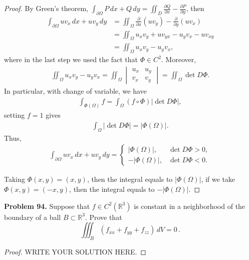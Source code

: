 \documentclass[11pt]{article}
\theoremstyle{definition}
\theoremstyle{definition}
\begin{document}
\begin{proof}
By Green's theorem, $\int_{\partial \Omega} P\, dx + Q\, dy = \iint_D \frac{\partial Q}{\partial x} - \frac{\partial P}{\partial y}$, then
\begin{align*}
    \int_{\partial\Omega} uv_x\, dx + uv_y\, dy & = \iint_\Omega \frac{\partial}{\partial x} \left(uv_y \right) - \frac{\partial}{\partial y} \left(uv_x \right) \\
    & = \iint_\Omega u_xv_y + u v_{yx} - u_y v_x - u v_{xy} \\
    & = \iint_\Omega u_xv_y - u_y v_x,
\end{align*}
where in the last step we used the fact that $\Phi \in C^2$. Moreover, 
\begin{align*}
    \iint_\Omega u_xv_y - u_y v_x = \iint_\Omega \begin{vmatrix}
        u_x & u_y \\
        v_x & v_y
    \end{vmatrix} = \iint_\Omega \det D\Phi.
\end{align*}
In particular, with change of variable, we have
\begin{align*}
    \int_{\Phi(\Omega)} f = \int_{\Omega} (f\circ \Phi) |\det D\Phi|,
\end{align*}
setting $f = 1$ gives
\begin{align*}
    \int_{\Omega} |\det D\Phi| = |\Phi(\Omega)|.
\end{align*}
Thus, 
\begin{align*}
    \int_{\partial\Omega} uv_x\, dx + uv_y\, dy = 
    \begin{cases}
        |\Phi(\Omega)|, & \det D\Phi > 0, \\
        - |\Phi(\Omega)|, & \det D\Phi < 0.
    \end{cases}
\end{align*}

Taking $\Phi(x,y) = (x,y)$, then the integral equals to $|\Phi(\Omega)|$, if we take $\Phi(x,y) = (-x,y)$, then the integral equals to $-|\Phi(\Omega)|$.
\end{proof}


\medskip




\noindent
{\bf Problem 94.}
Suppose that $f\in C^2(\mathbb{R}^3)$ is constant in a neighborhood of the boundary of
a ball $B\subset\mathbb{R}^3$. Prove that
$$
\iiint_B (f_{xx}+f_{yy}+f_{zz})\, dV = 0\, .
$$
\begin{proof}
	WRITE YOUR SOLUTION HERE.
\end{proof}
\end{document}

